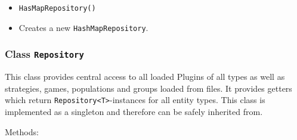 \documentclass[parskip=full,11pt]{scrartcl}
\begin{document}
\begin{itemize} \itemsep -10pt
	\item \texttt{HasMapRepository()}
	\item[] Creates a new \texttt{HashMapRepository}.
\end{itemize}

\subsubsection{Class \texttt{Repository}}

This class provides central access to all loaded Plugins of all types as well as strategies, games, populations and groups loaded from files. It provides getters which return \texttt{Repository<T>}-instances for all entity types. This class is implemented as a singleton and therefore can be safely inherited from. 

Methods:
\end{document}
